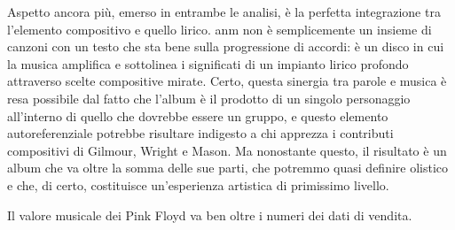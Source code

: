 \documentclass[class=book, crop=false, oneside, 12pt]{standalone}
\begin{document}
Aspetto ancora più, emerso in entrambe le analisi,  è la perfetta integrazione tra l'elemento compositivo e quello lirico. \acrlong{anm} non è semplicemente un insieme di canzoni con un testo che sta bene sulla progressione di accordi: è un disco in cui la musica  amplifica e sottolinea i significati di un impianto lirico profondo attraverso scelte compositive mirate. Certo, questa sinergia tra parole e musica è resa possibile dal fatto che l'album è il prodotto di un singolo personaggio all'interno di quello che dovrebbe essere un gruppo, e questo elemento autoreferenziale potrebbe risultare indigesto a chi apprezza i contributi compositivi di Gilmour, Wright e Mason. Ma nonostante questo, il risultato è un album che va oltre la somma delle sue parti, che potremmo quasi definire olistico e che, di certo, costituisce un'esperienza artistica di primissimo livello. 

Il valore musicale dei Pink Floyd va ben oltre i numeri dei dati di vendita.
\end{document}
